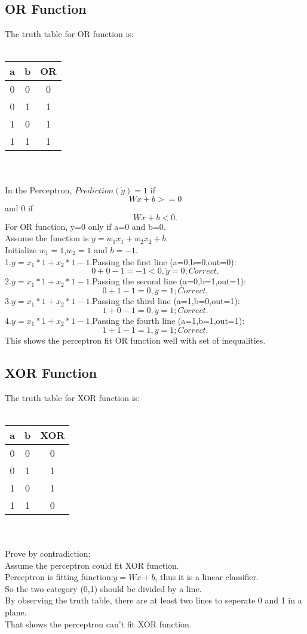 \documentclass{article}
\begin{document}
\subsection{OR Function}
The truth table for OR function is:\\
\\
\begin{tabular}{|c|c|c|}
\hline
a&b&OR\\
\hline
0&0&0\\
0&1&1\\
1&0&1\\
1&1&1\\
\hline
\end{tabular}\\
\\
In the Perceptron, $Prediction (\dot y) = 1$ if $$Wx+b >= 0$$ and 0 if $$Wx+b<0.$$
For OR function, y=0 only if a=0 and b=0.\\
Assume the function is $y=w_1 x_1+w_2 x_2+b$.\\
Initialize $w_1=1$,$w_2=1$ and $b=-1$.\\
1.$y=x_1 *1+x_2 *1-1$.Passing the first line (a=0,b=0,out=0):$$0+0-1=-1<0,\dot y =0;Correct.$$
2.$y=x_1 *1+x_2 *1-1$.Passing the second line (a=0,b=1,out=1):$$0+1-1=0,\dot y =1;Correct.$$ 
3.$y=x_1 *1+x_2 *1-1$.Passing the third line (a=1,b=0,out=1):$$1+0-1=0,\dot y =1;Correct.$$ 
4.$y=x_1 *1+x_2 *1-1$.Passing the fourth line (a=1,b=1,out=1):$$1+1-1=1,\dot y =1;Correct.$$ 
This shows the perceptron fit OR function well with set of inequalities.


\subsection{XOR Function}
The truth table for XOR function is:\\
\\
\begin{tabular}{|c|c|c|}
\hline
a&b&XOR\\
\hline
0&0&0\\
0&1&1\\
1&0&1\\
1&1&0\\
\hline
\end{tabular}\\
\\
Prove by contradiction:\\
Assume the perceptron could fit XOR function. \\Perceptron is fitting function:$y=Wx+b$, thus it is a linear classifier.\\
So the two category (0,1) should be divided by a line.\\
By observing the truth table, there are at least two lines to seperate 0 and 1 in a plane.\\
That shows the perceptron can't fit XOR function.
\end{document}
